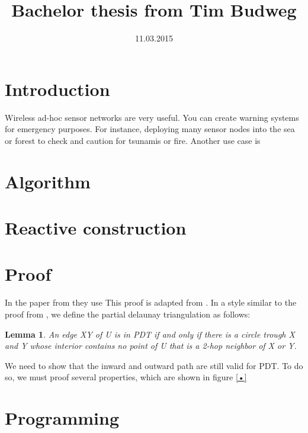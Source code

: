 \documentclass[a4paper,twoside, onecolumn]{IEEEtran}
\title{Bachelor thesis from Tim Budweg}
\author{}
\date{11.03.2015}
\newtheorem{emptycircle}{Lemma}[section]
\begin{document}
\maketitle

\section{Introduction}
Wireless ad-hoc sensor networks are very useful. 
You can create warning systems for emergency purposes.
For instance, deploying many sensor nodes into the sea or forest to check and caution for tsunamis or fire.
Another use case is
\section{Algorithm}
\section{Reactive construction}
\section{Proof}
In the paper from \cite{kanj} they use 
This proof is adapted from \cite{kanj}.
In a style similar to the proof from \cite{kanj}, we define the partial delaunay triangulation as follows:
\begin{emptycircle}
An edge XY of U is in PDT if and only if there is a circle trough X and Y whose interior contains no point of U that is a 2-hop neighbor of X or Y.
\end{emptycircle}
We need to show that the inward and outward path are still valid for PDT.
To do so, we must proof several properties, which are shown in figure \ref{•}


\section{Programming}



\end{document}
